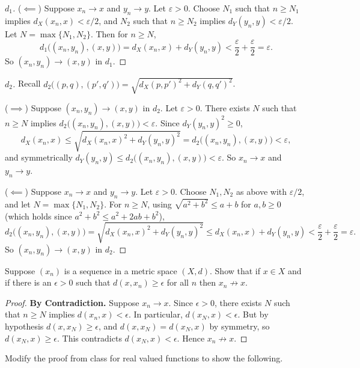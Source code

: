 \documentclass[minion]{homework}
\begin{document}
\begin{problems}
\begin{proof}[$d_1$]
  ($\impliedby$) Suppose $x_n \to x$ and $y_n \to y$. Let $\varepsilon > 0$. Choose $N_1$ such that $n \geq N_1$ implies $d_X(x_n,x) < \varepsilon/2$, and $N_2$ such that $n \geq N_2$ implies $d_Y(y_n,y) < \varepsilon/2$. Let $N = \max\{N_1,N_2\}$. Then for $n \geq N$,
  $$d_1\big((x_n,y_n),(x,y)\big) = d_X(x_n,x) + d_Y(y_n,y) < \frac\varepsilon2 + \frac\varepsilon2 = \varepsilon.$$
  So $(x_n,y_n) \to (x,y)$ in $d_1$.
\end{proof}
\begin{proof}[$d_2$]
  Recall $d_2\big((p,q),(p',q')\big) = \sqrt{d_X(p,p')^2 + d_Y(q,q')^2}$.

  ($\implies$) Suppose $(x_n,y_n) \to (x,y)$ in $d_2$. Let $\varepsilon > 0$. There exists $N$ such that $n \geq N$ implies $d_2\big((x_n,y_n),(x,y)\big) < \varepsilon$. Since $d_Y(y_n,y)^2 \geq 0$,
  $$d_X(x_n,x) \leq \sqrt{d_X(x_n,x)^2 + d_Y(y_n,y)^2} = d_2\big((x_n,y_n),(x,y)\big) < \varepsilon,$$
  and symmetrically $d_Y(y_n,y) \leq d_2\big((x_n,y_n),(x,y)\big) < \varepsilon$. So $x_n \to x$ and $y_n \to y$.

  ($\impliedby$) Suppose $x_n \to x$ and $y_n \to y$. Let $\varepsilon > 0$. Choose $N_1, N_2$ as above with $\varepsilon/2$, and let $N = \max\{N_1,N_2\}$. For $n \geq N$, using $\sqrt{a^2+b^2} \leq a + b$ for $a,b \geq 0$ (which holds since $a^2+b^2 \leq a^2+2ab+b^2$),
  $$d_2\big((x_n,y_n),(x,y)\big) = \sqrt{d_X(x_n,x)^2 + d_Y(y_n,y)^2} \leq d_X(x_n,x) + d_Y(y_n,y) < \frac\varepsilon2+\frac\varepsilon2 = \varepsilon.$$
  So $(x_n,y_n) \to (x,y)$ in $d_2$.
\end{proof}

\problem Suppose $(x_n)$ is a sequence in a metric space $(X,d)$.
Show that if $x\in X$ and if there is an $\epsilon>0$ such
that $d(x,x_n)\ge \epsilon$ for all $n$ then $x_n\not\to x$. \newline
\begin{proof}
  \textbf{By Contradiction.} Suppose $x_n \to x$. Since $\epsilon > 0$, there exists $N$ such that $n \geq N$ implies $d(x_n,x) < \epsilon$. In particular, $d(x_N,x) < \epsilon$. But by hypothesis $d(x,x_N) \geq \epsilon$, and $d(x,x_N) = d(x_N,x)$ by symmetry, so $d(x_N,x) \geq \epsilon$. This contradicts $d(x_N,x) < \epsilon$. Hence $x_n \not\to x$.
\end{proof}

\problem Modify the proof from class for real valued functions to show
the following.


\end{problems}
\end{document}
